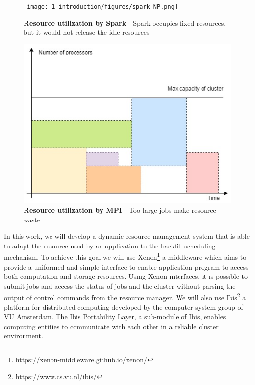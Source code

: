 \begin{figure}
    \centering
    \begin{minipage}{.5\textwidth}
      \centering
      \texttt{[image: 1\_introduction/figures/spark\_NP.png]}
      \caption[SparkUti]{{\small\textbf{Resource utilization by Spark} - Spark occupies fixed resources, but it would not release the idle resources}}
      \label{fig:sparkUti}
    \end{minipage}%
    \begin{minipage}{.5\textwidth}
      \centering
      \includegraphics[width=0.9\linewidth]{1_introduction/figures/MPI_batch.jpg}
      \caption[MPIUti]{{\small\textbf{Resource utilization by MPI} - Too large jobs make resource waste}}
      \label{fig:MPIUti}
    \end{minipage}
\end{figure}
In this work, we will develop a dynamic resource management system that is able to adapt the resource used by an application to the backfill scheduling mechanism. 
To achieve this goal we will use Xenon\footnote{\url{https://xenon-middleware.github.io/xenon/}} a middleware which aims to provide a uniformed and simple interface to enable application program to access both computation and storage resources.
Using Xenon interfaces, it is possible to submit jobs and access the status of jobs and the cluster without parsing the output of control commands from the resource manager. 
We will also use Ibis\footnote{\url{https://www.cs.vu.nl/ibis/}} a platform for distributed computing developed by the computer system group of VU Amsterdam. 
The Ibis Portability Layer, a sub-module of Ibis, enables computing entities to communicate with each other in a reliable cluster environment.
